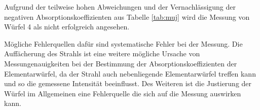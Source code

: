 \noindent
Aufgrund der teilweise hohen Abweichungen und der Vernachlässigung der negativen Absorptionskoeffizienten aus Tabelle \ref{tab:muj} wird die Messung von Würfel 4 als nicht erfolgreich angesehen.

\noindent
Mögliche Fehlerquellen dafür sind systematische Fehler bei der Messung.
Die Auffächerung des Strahls ist eine weitere 
mögliche Ursache von Messungenauigkeiten bei der Bestimmung der Absorptionskoeffizienten der Elementarwürfel, da der Strahl auch nebenliegende
Elementarwürfel treffen kann und so die gemessene Intensität beeinflusst.
Des Weiteren ist die Justierung der Würfel im Allgemeinen eine Fehlerquelle die sich auf die Messung auswirken kann.